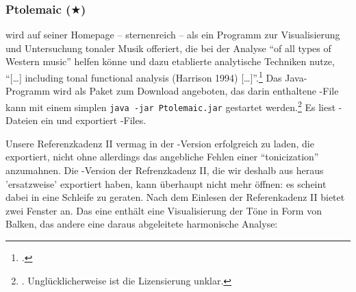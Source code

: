 %
%
%




\subsubsection{Ptolemaic ($\bigstar$)}

\label{Ptolemaic} wird auf seiner Homepage -- sternenreich -- als
ein Programm zur Visualisierung und Untersuchung tonaler Musik offeriert, die
bei der Analyse \enquote{of all types of Western music} helfen könne und dazu
etablierte analytische Techniken nutze, \enquote{[\ldots] including tonal
functional analysis (Harrison 1994) [\ldots]}.\footcite[vgl.][\nopage
wp]{Ptolemaic2016a} Das Java-Programm wird als Paket zum Download angeboten, das
darin enthaltene -File kann mit einem simplen \texttt{java -jar
Ptolemaic.jar} gestartet werden.\footnote{\cite[vgl.][\nopage
wp]{Ptolemaic2016b}. Unglücklicherweise ist die Lizensierung unklar.} Es liest
-Dateien ein und exportiert -Files.

Unsere Referenzkadenz II vermag  in der -Version
erfolgreich zu laden, die  exportiert, nicht ohne allerdings das
angebliche Fehlen einer \enquote{tonicization} anzumahnen. Die
-Version der Refrenzkadenz II, die wir deshalb aus 
heraus 'ersatzweise' exportiert haben, kann  überhaupt nicht mehr
öffnen: es scheint dabei in eine Schleife zu geraten. Nach dem Einlesen der
Referenkadenz II bietet  zwei Fenster an. Das eine enthält eine
Visualisierung der Töne in Form von Balken, das andere eine daraus abgeleitete
harmonische Analyse:

